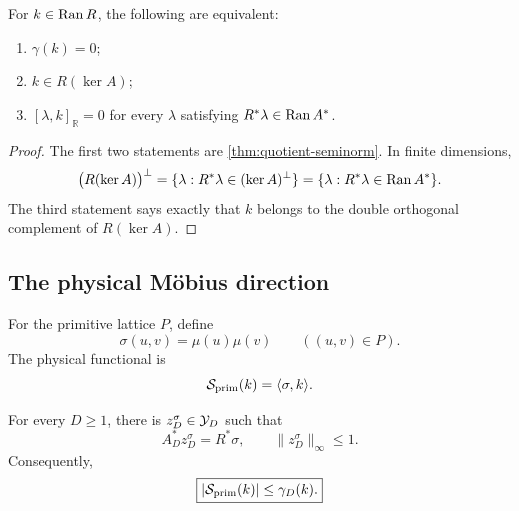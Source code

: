 \begin{proposition}
\label{prop:zero-cost-annihilator}
For \(k\in\operatorname{Ran} R\), the following are equivalent:
\begin{enumerate}[label=\textup{(\roman*)},leftmargin=2.6em]
 \item \(\gamma(k)=0\);
 \item \(k\in R(\ker A)\);
 \item \([\lambda,k]_{\mathbb R}=0\) for every
       \(\lambda\) satisfying
       \(R^*\lambda\in\operatorname{Ran} A^*\).
\end{enumerate}
\end{proposition}

\begin{proof}
The first two statements are
\cref{thm:quotient-seminorm}.  In finite dimensions,
\[
 \bigl(R(\ker A)\bigr)^\perp
 =
 \{\lambda:R^*\lambda\in(\ker A)^\perp\}
 =
 \{\lambda:R^*\lambda\in\operatorname{Ran} A^*\}.
\]
The third statement says exactly that \(k\) belongs to the double
orthogonal complement of \(R(\ker A)\).
\end{proof}

\subsection{The physical M\"obius direction}

For the primitive lattice \(P\), define
\[
 \sigma(u,v)=\mu(u)\mu(v)
 \qquad((u,v)\in P).
\]
The physical functional is
\[
 \mathcal S_{\rm prim}(k)=\langle\sigma,k\rangle.
\]

\begin{theorem}
\label{thm:arithmetic-dual-witness}
For every \(D\ge1\), there is
\(z^\sigma_D\in\mathcal Y_D\) such that
\begin{equation}
 A_D^*z^\sigma_D=R^*\sigma,
 \qquad
 \|z^\sigma_D\|_\infty\le1.
 \label{eq:arithmetic-dual-feasible}
\end{equation}
Consequently,
\begin{equation}
 \boxed{
 |\mathcal S_{\rm prim}(k)|
 \le \gamma_D(k).}
 \label{eq:physical-below-gauge}
\end{equation}
\end{theorem}

